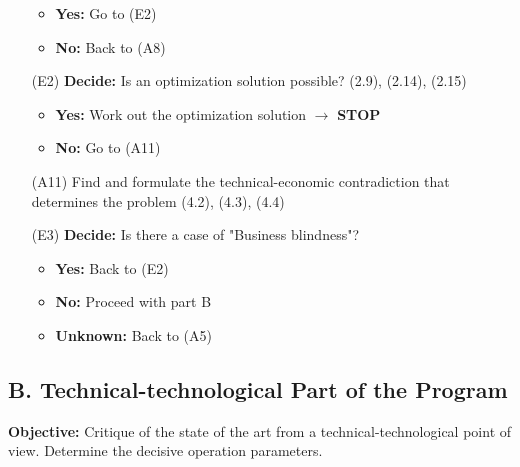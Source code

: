 \documentclass[11pt,a4paper]{article}
\begin{document}
\begin{itemize}[leftmargin=30pt]
\begin{itemize}[leftmargin=20pt,noitemsep]
  \item \textbf{Yes:} Go to (E2)
  \item \textbf{No:} Back to (A8)
  \end{itemize}
\item[(E2)] \textbf{Decide:} Is an optimization solution possible?  (2.9),
  (2.14), (2.15)
  \begin{itemize}[leftmargin=20pt,noitemsep]
  \item \textbf{Yes:} Work out the optimization solution $\to$ \textbf{STOP}
  \item \textbf{No:} Go to (A11)
  \end{itemize}
\item[(A11)] Find and formulate the technical-economic contradiction that
  determines the problem (4.2), (4.3), (4.4)
\item[(E3)] \textbf{Decide:} Is there a case of "Business blindness"? 
  \begin{itemize}[leftmargin=20pt,noitemsep]
  \item \textbf{Yes:} Back to (E2)
  \item \textbf{No:} Proceed with part B
  \item \textbf{Unknown:} Back to (A5)
  \end{itemize}
\end{itemize}

\subsection*{B. Technical-technological Part of the Program}

\textbf{Objective:} Critique of the state of the art from a
technical-technological point of view. Determine the decisive operation
parameters.
\end{document}
